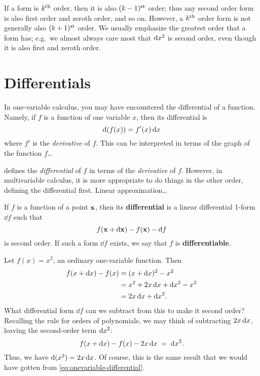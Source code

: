 \documentclass[12pt]{amsart}
\begin{document}
\begin{rmk}
  If a form is $k^{\mathrm{th}}$ order, then it is also $(k-1)^{\mathrm{st}}$ order; thus any second order form is also first order and zeroth order, and so on.
  However, a $k^{\mathrm{th}}$ order form is not generally also $(k+1)^{\mathrm{st}}$ order.
  We usually emphasize the greatest order that a form has; e.g.\ we almost always care most that $\mathrm{d} x^2$ is second order, even though it is also first and zeroth order.
\end{rmk}


\section{Differentials}
\label{sec:differentials}

In one-variable calculus, you may have encountered the differential of a function.
Namely, if $f$ is a function of one variable $x$, then its differential is
\begin{equation}
  \mathrm{d}(f(x)) = f'(x) \, \mathrm{d} x\label{eq:onevariable-differential}
\end{equation}
where $f'$ is the \emph{derivative} of $f$.
This can be interpreted in terms of the graph of the function $f$\dots

 defines the \emph{differential} of $f$ in terms of the \emph{derivative} of $f$.
However, in multivariable calculus, it is more appropriate to do things in the other order, defining the differential first.
Linear approximation\dots

\begin{defn}
  If $f$ is a function of a point $\mathbf{x}$, then its \textbf{differential} is a linear differential 1-form $\dd f$ such that
  \[ f(\mathbf{x} + \mathrm{d}\mathbf{x}) - f(\mathbf{x}) - \mathrm{d} f \]
  is second order.
  If such a form $\dd f$ exists, we say that $f$ is \textbf{differentiable}.
\end{defn}

\begin{eg}
  Let $f(x) = x^2$, an ordinary one-variable function.
  Then
  \begin{align*}
    f(x + \mathrm{d} x) - f(x) &= (x+\mathrm{d} x)^2 - x^2\\
    &= x^2 + 2 x \, \mathrm{d} x + \mathrm{d} x^2 - x^2\\
    &= 2x \, \mathrm{d} x + \mathrm{d} x ^2.
  \end{align*}
  What differential form $\dd f$ can we subtract from this to make it second order?
  Recalling the rule for orders of polynomials, we may think of subtracting $2x \, \mathrm{d} x$, leaving the second-order term $\mathrm{d} x^2$:
  \[ f(x + \mathrm{d} x) - f(x) - 2x \, \mathrm{d} x \;=\; \mathrm{d} x^2. \]
  Thus, we have $\mathrm{d}(x^2) = 2 x \, \mathrm{d} x$.
  Of course, this is the same result that we would have gotten from \cref{eq:onevariable-differential}.
\end{eg}
\end{document}
